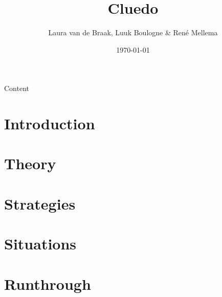 \documentclass{beamer}
\title{Cluedo}
\author{Laura van de Braak, Luuk Boulogne \& Ren\'e Mellema}
\date{\today}
\begin{document}
\begin{frame}
    \titlepage
\end{frame}

\begin{frame}{Content}
  \tableofcontents
\end{frame}

\section{Introduction}


\section{Theory}


\section{Strategies}


\section{Situations}


\section{Runthrough}

\end{document}
